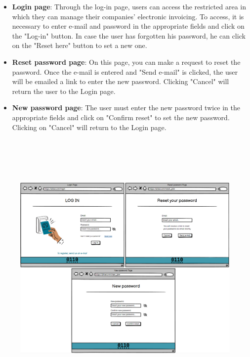 \begin{itemize}
    \item \textbf{Login page}: Through the log-in page, users can access the restricted area in which they can manage their companies' electronic invoicing. To access, it is necessary to enter e-mail and password in the appropriate fields and click on the "Log-in" button.
In case the user has forgotten his password, he can click on the "Reset here" button to set a new one.
    \item \textbf{Reset password page}: On this page, you can make a request to reset the password. Once the e-mail is entered and "Send e-mail" is clicked, the user will be emailed a link to enter the new password. Clicking "Cancel" will return the user to the Login page.
    \item \textbf{New password page}: The user must enter the new password twice in the appropriate fields and click on "Confirm reset" to set the new password. Clicking on "Cancel" will return to the Login page.
\end{itemize}

\begin{figure}[h!]
    \centering
    \includegraphics[height=390pt, keepaspectratio]{resources/mockup/Login.png}
\end{figure}


